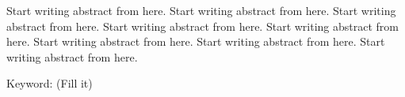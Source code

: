 \begin{EnAbstract}

    \begin{EnAbstractDescription}
        Start writing abstract from here. Start writing abstract from here. Start writing abstract from here. Start writing abstract from here. Start writing abstract from here. Start writing abstract from here. Start writing abstract from here. Start writing abstract from here.
    \end{EnAbstractDescription}

    \noindent \text Keyword: (Fill it)
    
\end{EnAbstract}

